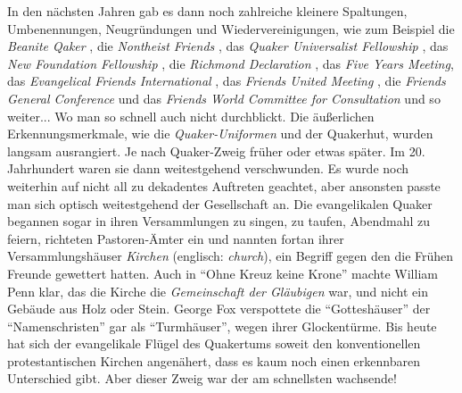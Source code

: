 In den nächsten Jahren gab es dann noch zahlreiche kleinere Spaltungen,
Umbenennungen, Neugründungen und Wiedervereinigungen, wie zum Beispiel die
\textit{Beanite Qaker} , die \textit{Nontheist
Friends} , das \textit{Quaker Universalist
Fellowship} , das \textit{New
Foundation Fellowship} , die
\textit{Richmond Declaration} , das \textit{Five
Years Meeting}, das \textit{Evangelical Friends International}
, das \textit{Friends United
Meeting} , die \textit{Friends General
Conference}  und das \textit{Friends
World Committee for Consultation} und so weiter... Wo man so schnell auch nicht
durchblickt.
Die äußerlichen Erkennungsmerkmale, wie die \textit{Quaker-Uniformen}
 und der Quakerhut, wurden
langsam ausrangiert. Je nach Quaker-Zweig früher oder etwas später. Im 20.
Jahrhundert waren sie dann weitestgehend verschwunden. Es wurde noch weiterhin
auf
nicht all zu dekadentes Auftreten geachtet, aber ansonsten passte man sich
optisch weitestgehend der Gesellschaft an. Die evangelikalen Quaker begannen
sogar in ihren Versammlungen zu singen, zu taufen, Abendmahl zu feiern,
richteten Pastoren-Ämter ein und nannten
fortan ihrer Versammlungshäuser \textit{Kirchen} 
(englisch: \textit{church}),
ein Begriff gegen den die Frühen Freunde gewettert hatten. Auch in "`Ohne Kreuz
keine Krone"' machte William Penn klar, das die Kirche die \textit{Gemeinschaft
der
Gläubigen} war, und nicht ein Gebäude aus Holz oder Stein. George Fox
verspottete
die "`Gotteshäuser"' der "`Namenschristen"' gar als
"`Turmhäuser"', wegen ihrer
Glockentürme. Bis heute hat sich der evangelikale Flügel des Quakertums soweit
den konventionellen protestantischen Kirchen angenähert, dass es kaum noch
einen
erkennbaren Unterschied gibt. Aber dieser Zweig war der am schnellsten
wachsende!

\medskip

